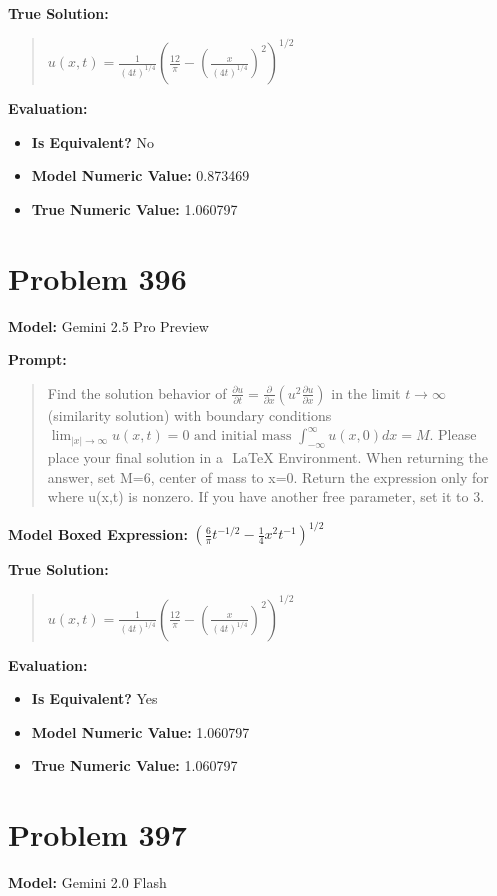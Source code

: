 \documentclass{article}
\begin{document}
{\textbf{True Solution:}
\begin{quote}
$u(x,t) = \frac{1}{(4t)^{1/4}} ( \frac{12}{\pi} - (\frac{x}{(4t)^{1/4}})^2 )^{1/2}$
\end{quote}

\textbf{Evaluation:}
\begin{itemize}
\item \textbf{Is Equivalent?} No
\item \textbf{Model Numeric Value:} 0.873469
\item \textbf{True Numeric Value:} 1.060797
\end{itemize}
\vspace{1cm}
\section*{Problem 396}
\textbf{Model:} Gemini 2.5 Pro Preview

\textbf{Prompt:}
\begin{quote}
Find the solution behavior of $\frac{\partial u}{\partial t} = \frac{\partial}{\partial x} \left( u^2 \frac{\partial u}{\partial x} \right)$ in the limit $t \to \infty$ (similarity solution) with boundary conditions $\lim_{|x| \to \infty} u(x,t) = 0 \text{ and initial mass } \int_{-\infty}^{\infty} u(x,0) dx = M$. Please place your final solution in a $\boxed{}$ LaTeX Environment. When returning the answer, set M=6, center of mass to x=0. Return the expression only for where u(x,t) is nonzero. If you have another free parameter, set it to 3.
\end{quote}
\textbf{Model Boxed Expression:} $\left(\frac{6}{\pi}t^{-1/2} - \frac{1}{4}x^2 t^{-1}\right)^{1/2}$

\textbf{True Solution:}
\begin{quote}
$u(x,t) = \frac{1}{(4t)^{1/4}} ( \frac{12}{\pi} - (\frac{x}{(4t)^{1/4}})^2 )^{1/2}$
\end{quote}

\textbf{Evaluation:}
\begin{itemize}
\item \textbf{Is Equivalent?} Yes
\item \textbf{Model Numeric Value:} 1.060797
\item \textbf{True Numeric Value:} 1.060797
\end{itemize}
\vspace{1cm}
\section*{Problem 397}
\textbf{Model:} Gemini 2.0 Flash

}
\end{document}
